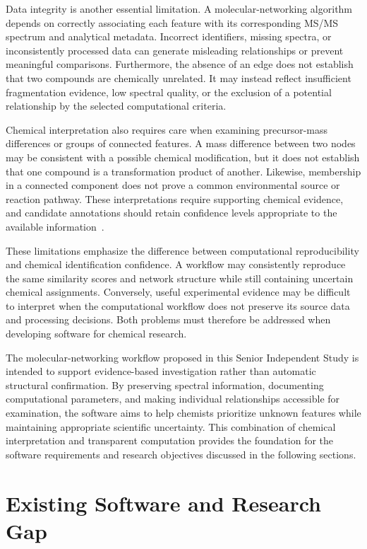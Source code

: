         Data integrity is another essential limitation. A molecular-networking algorithm depends on correctly associating each feature with its corresponding MS/MS spectrum and analytical metadata. Incorrect identifiers, missing spectra, or inconsistently processed data can generate misleading relationships or prevent meaningful comparisons. Furthermore, the absence of an edge does not establish that two compounds are chemically unrelated. It may instead reflect insufficient fragmentation evidence, low spectral quality, or the exclusion of a potential relationship by the selected computational criteria.

        Chemical interpretation also requires care when examining precursor-mass differences or groups of connected features. A mass difference between two nodes may be consistent with a possible chemical modification, but it does not establish that one compound is a transformation product of another. Likewise, membership in a connected component does not prove a common environmental source or reaction pathway. These interpretations require supporting chemical evidence, and candidate annotations should retain confidence levels appropriate to the available information~\cite{Schymanski2014,Ernst2019,Chao2025}.

        These limitations emphasize the difference between computational reproducibility and chemical identification confidence. A workflow may consistently reproduce the same similarity scores and network structure while still containing uncertain chemical assignments. Conversely, useful experimental evidence may be difficult to interpret when the computational workflow does not preserve its source data and processing decisions. Both problems must therefore be addressed when developing software for chemical research.

        The molecular-networking workflow proposed in this Senior Independent Study is intended to support evidence-based investigation rather than automatic structural confirmation. By preserving spectral information, documenting computational parameters, and making individual relationships accessible for examination, the software aims to help chemists prioritize unknown features while maintaining appropriate scientific uncertainty. This combination of chemical interpretation and transparent computation provides the foundation for the software requirements and research objectives discussed in the following sections.

\section{Existing Software and Research Gap}\label{sec:existing-software}

